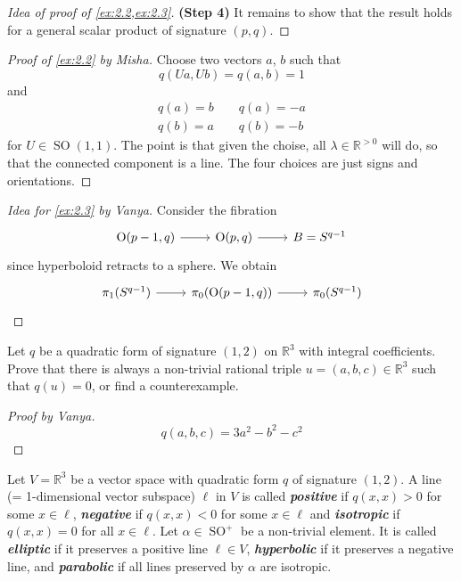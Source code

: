 \documentclass{article}
\numberwithin{equation}{section}
\newcommand{\R}{\mathbb{R}}
\renewcommand{\O}{\operatorname{O}}
\DeclareMathOperator{\SO}{SO}
\begin{document}
\begin{proof}[Idea of proof of \cref{ex:2.2,ex:2.3}]
		\textbf{(Step 4)} It remains to show that the result holds for a general scalar product of signature $(p,q)$.
		
	\end{proof}
	
	\begin{proof}[Proof of \cref{ex:2.2} by Misha]
		Choose two vectors $a$, $b$ such that
		\[q(Ua,Ub)=q(a,b)=1\]
		and
		\begin{align*}
			q(a)=b\qquad q(a)=-a\\
			q(b)=a\qquad q(b)=-b
		\end{align*}
		for $U\in\SO(1,1)$. The point is that given the choise, all $\lambda\in\R^{>0}$ will do, so that the connected component is a line. The four choices are just signs and orientations.
	\end{proof}
	
	\begin{proof}[Idea for \cref{ex:2.3} by Vanya]
		Consider the fibration
		\[\begin{tikzcd}
			\O(p-1,q)\arrow[r]&\O(p,q)\arrow[r]&B=S^{q-1}
		\end{tikzcd}\]
		since hyperboloid retracts to a sphere. We obtain
		\[\begin{tikzcd}
			\pi_1(S^{q-1})\arrow[r]&\pi_0(\O(p-1,q))\arrow[r]&\pi_0(S^{q-1})
		\end{tikzcd}\]
	\end{proof}
	
	\begin{exercise}
		Let $q$ be a quadratic form of signature $(1,2)$ on $\R^3$ with integral coefficients. Prove that there is always a non-trivial rational triple $u=(a,b,c)\in\R^3$ such that $q(u)=0$, or find a counterexample.
	\end{exercise}
	\begin{proof}[Proof by Vanya]
		\[q(a,b,c)=3a^2-b^2-c^2\]
	\end{proof}
	\begin{defn}
		Let $V=\R^3$ be a vector space with quadratic form $q$ of signature $(1,2)$. A line (= 1-dimensional vector subspace) $\ell$ in $V$ is called \textbf{\textit{positive}} if $q(x,x)>0$ for some $x\in\ell$, \textbf{\textit{negative}} if $q(x,x)<0$ for some $x\in\ell$ and \textbf{\textit{isotropic}} if $q(x,x)=0$ for all $x\in\ell$. Let $\alpha\in\SO^+$ be a non-trivial element. It is called \textbf{\textit{elliptic}} if it preserves a positive line $\ell\in V$, \textbf{\textit{hyperbolic}} if it preserves a negative line, and \textbf{\textit{parabolic}} if all lines preserved by $\alpha$ are isotropic.
	\end{defn}
	
\end{document}
